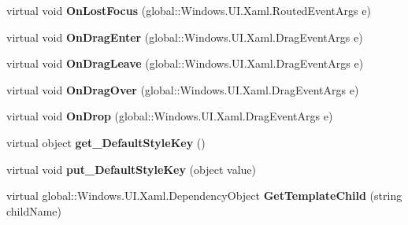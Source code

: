 \begin{DoxyCompactItemize}
virtual void {\bfseries On\+Lost\+Focus} (global\+::\+Windows.\+U\+I.\+Xaml.\+Routed\+Event\+Args e)
\item 
\mbox{\label{class_windows_1_1_u_i_1_1_xaml_1_1_controls_1_1_control_ae5a8a218b89ca66425059a8e09fc0c0d}} 
virtual void {\bfseries On\+Drag\+Enter} (global\+::\+Windows.\+U\+I.\+Xaml.\+Drag\+Event\+Args e)
\item 
\mbox{\label{class_windows_1_1_u_i_1_1_xaml_1_1_controls_1_1_control_a1812d64c2440d2cd9f93660273ef5896}} 
virtual void {\bfseries On\+Drag\+Leave} (global\+::\+Windows.\+U\+I.\+Xaml.\+Drag\+Event\+Args e)
\item 
\mbox{\label{class_windows_1_1_u_i_1_1_xaml_1_1_controls_1_1_control_a5c8a657f99279b16e32bf35998d46838}} 
virtual void {\bfseries On\+Drag\+Over} (global\+::\+Windows.\+U\+I.\+Xaml.\+Drag\+Event\+Args e)
\item 
\mbox{\label{class_windows_1_1_u_i_1_1_xaml_1_1_controls_1_1_control_ade79c678fe0c5aa32e43c4772d34e61e}} 
virtual void {\bfseries On\+Drop} (global\+::\+Windows.\+U\+I.\+Xaml.\+Drag\+Event\+Args e)
\item 
\mbox{\label{class_windows_1_1_u_i_1_1_xaml_1_1_controls_1_1_control_a0f6b7d0a6e0dbad0ff65dd5861c20050}} 
virtual object {\bfseries get\+\_\+\+Default\+Style\+Key} ()
\item 
\mbox{\label{class_windows_1_1_u_i_1_1_xaml_1_1_controls_1_1_control_a6cc396f98c5876ae256d5b6d1c78ded9}} 
virtual void {\bfseries put\+\_\+\+Default\+Style\+Key} (object value)
\item 
\mbox{\label{class_windows_1_1_u_i_1_1_xaml_1_1_controls_1_1_control_ac603c14d7442a0aa06e00197591e9394}} 
virtual global\+::\+Windows.\+U\+I.\+Xaml.\+Dependency\+Object {\bfseries Get\+Template\+Child} (string child\+Name)
\item 
\mbox{\label{class_windows_1_1_u_i_1_1_xaml_1_1_controls_1_1_control_ae3e99583865513e0de94e3c419b26924}} 

\end{DoxyCompactItemize}
